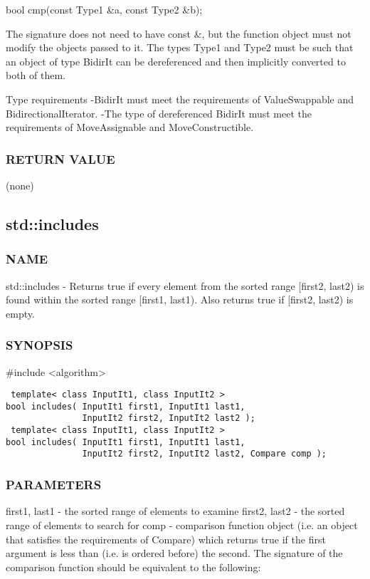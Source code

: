  bool cmp(const Type1 \&a, const Type2 \&b);

The signature does not need to have const \&, but the function object must not modify the objects passed to it.
The types Type1 and Type2 must be such that an object of type BidirIt can be dereferenced and then implicitly converted to both of them.

 Type requirements
 -BidirIt must meet the requirements of ValueSwappable and BidirectionalIterator.
 -The type of dereferenced BidirIt must meet the requirements of MoveAssignable and MoveConstructible.

\subsubsection{RETURN VALUE}
(none)



\subsection{std::includes}

\subsubsection{NAME}
std::includes - Returns true if every element from the sorted range [first2, last2) is found within the sorted range [first1, last1). Also returns true if [first2, last2) is empty.

\subsubsection{SYNOPSIS}
\#include <algorithm>

\begin{lstlisting}
 template< class InputIt1, class InputIt2 >
bool includes( InputIt1 first1, InputIt1 last1,
               InputIt2 first2, InputIt2 last2 );
 template< class InputIt1, class InputIt2 >
bool includes( InputIt1 first1, InputIt1 last1,
               InputIt2 first2, InputIt2 last2, Compare comp );
\end{lstlisting}

\subsubsection{PARAMETERS}
first1, last1 - the sorted range of elements to examine
first2, last2 - the sorted range of elements to search for
comp - comparison function object (i.e. an object that satisfies the requirements of Compare) which returns true if the first argument is less than (i.e. is ordered before) the second.
The signature of the comparison function should be equivalent to the following:

